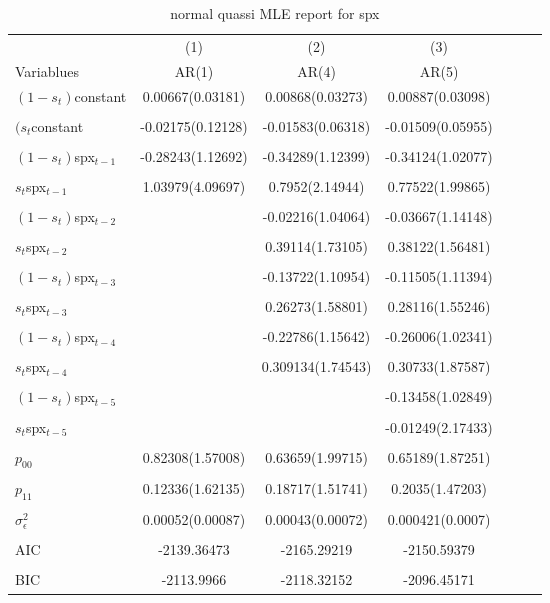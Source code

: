 \documentclass{article}
\begin{document}
\begin{table}[h!]
\begin{center}
  \begin{tabular}{lcccccc}
     & (1) & (2) & (3) \\
    Variablues & AR(1) & AR(4) & AR(5)  \\
    \hline
    $(1-s_t)$constant & 0.00667(0.03181) & 0.00868(0.03273) & 0.00887(0.03098) \\
    \\
    $(s_t$constant & -0.02175(0.12128) & -0.01583(0.06318) & -0.01509(0.05955) \\
    \\
    $(1-s_t)$spx$_{t-1}$ & -0.28243(1.12692) & -0.34289(1.12399) & -0.34124(1.02077)  \\
    \\
    $s_t$spx$_{t-1}$ & 1.03979(4.09697) & 0.7952(2.14944) & 0.77522(1.99865) \\
    \\
    $(1-s_t)$spx$_{t-2}$ & & -0.02216(1.04064) &  -0.03667(1.14148) \\
    \\
    $s_t$spx$_{t-2}$ & & 0.39114(1.73105) & 0.38122(1.56481) \\
    \\
    $(1-s_t)$spx$_{t-3}$ & & -0.13722(1.10954) & -0.11505(1.11394) \\
    \\
    $s_t$spx$_{t-3}$ & & 0.26273(1.58801) & 0.28116(1.55246) \\
    \\
    $(1-s_t)$spx$_{t-4}$ & & -0.22786(1.15642) & -0.26006(1.02341) \\
    \\
    $s_t$spx$_{t-4}$ & & 0.309134(1.74543) & 0.30733(1.87587) \\
    \\
    $(1-s_t)$spx$_{t-5}$ & & & -0.13458(1.02849)  \\
    \\
    $s_t$spx$_{t-5}$ & & & -0.01249(2.17433) \\
    \\
    $p_{00}$ & 0.82308(1.57008) & 0.63659(1.99715) & 0.65189(1.87251) \\
    \\
    $p_{11}$ &  0.12336(1.62135) & 0.18717(1.51741) & 0.2035(1.47203) \\
    \\
    $\sigma_{\epsilon}^2$ & 0.00052(0.00087)  & 0.00043(0.00072) & 0.000421(0.0007)\\
    \\
    AIC & -2139.36473 & -2165.29219 & -2150.59379 \\
    \\
    BIC & -2113.9966 & -2118.32152 & -2096.45171 \\
    \hline
  \end{tabular}
  \caption{normal quassi MLE report for spx}
\end{center}
\end{table}
\end{document}
